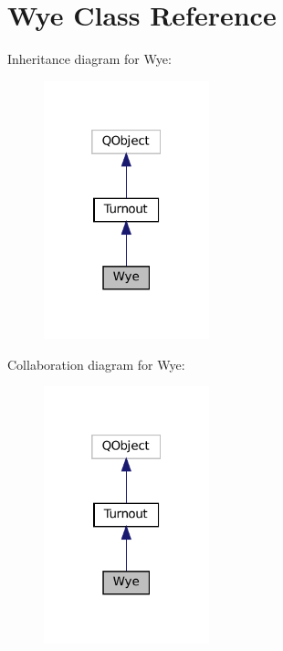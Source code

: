 \hypertarget{classWye}{}\section{Wye Class Reference}
\label{classWye}


Inheritance diagram for Wye\+:
\nopagebreak
\begin{figure}[H]
\begin{center}
\leavevmode
\includegraphics[width=136pt]{classWye__inherit__graph}
\end{center}
\end{figure}


Collaboration diagram for Wye\+:
\nopagebreak
\begin{figure}[H]
\begin{center}
\leavevmode
\includegraphics[width=136pt]{classWye__coll__graph}
\end{center}
\end{figure}
